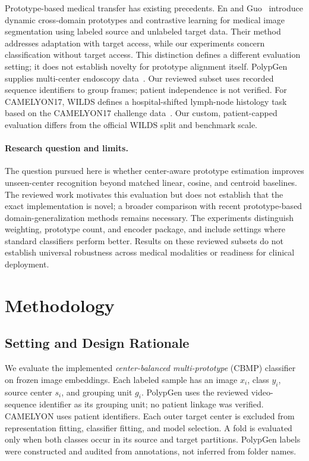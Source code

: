 Prototype-based medical transfer has existing precedents. En and Guo~\cite{en2024dpcl} introduce dynamic cross-domain prototypes and contrastive learning for medical image segmentation using labeled source and unlabeled target data. Their method addresses adaptation with target access, while our experiments concern classification without target access. This distinction defines a different evaluation setting; it does not establish novelty for prototype alignment itself. PolypGen supplies multi-center endoscopy data~\cite{ali2023polypgen}. Our reviewed subset uses recorded sequence identifiers to group frames; patient independence is not verified. For CAMELYON17, WILDS defines a hospital-shifted lymph-node histology task~\cite{koh2021wilds} based on the CAMELYON17 challenge data~\cite{bandi2019camelyon}. Our custom, patient-capped evaluation differs from the official WILDS split and benchmark scale.

\paragraph{Research question and limits.}
The question pursued here is whether center-aware prototype estimation improves unseen-center recognition beyond matched linear, cosine, and centroid baselines. The reviewed work motivates this evaluation but does not establish that the exact implementation is novel; a broader comparison with recent prototype-based domain-generalization methods remains necessary. The experiments distinguish weighting, prototype count, and encoder package, and include settings where standard classifiers perform better. Results on these reviewed subsets do not establish universal robustness across medical modalities or readiness for clinical deployment.

\section{Methodology}
\label{sec:method}

\subsection{Setting and Design Rationale}
We evaluate the implemented \emph{center-balanced multi-prototype} (CBMP) classifier on frozen image embeddings. Each labeled sample has an image $x_i$, class $y_i$, source center $s_i$, and grouping unit $g_i$. PolypGen uses the reviewed video-sequence identifier as its grouping unit; no patient linkage was verified. CAMELYON uses patient identifiers. Each outer target center is excluded from representation fitting, classifier fitting, and model selection. A fold is evaluated only when both classes occur in its source and target partitions. PolypGen labels were constructed and audited from annotations, not inferred from folder names.

